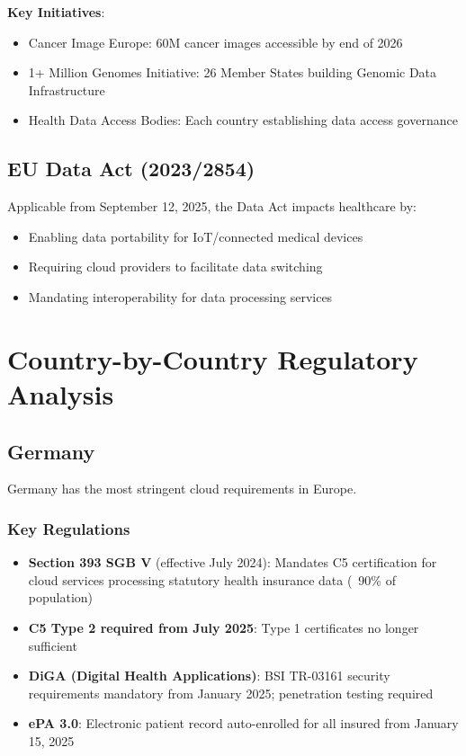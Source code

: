 \documentclass[11pt,a4paper]{article}
\begin{document}
\textbf{Key Initiatives}:
\begin{itemize}
    \item Cancer Image Europe: 60M cancer images accessible by end of 2026
    \item 1+ Million Genomes Initiative: 26 Member States building Genomic Data Infrastructure
    \item Health Data Access Bodies: Each country establishing data access governance
\end{itemize}

\subsection{EU Data Act (2023/2854)}

Applicable from September 12, 2025, the Data Act impacts healthcare by:
\begin{itemize}
    \item Enabling data portability for IoT/connected medical devices
    \item Requiring cloud providers to facilitate data switching
    \item Mandating interoperability for data processing services
\end{itemize}

\section{Country-by-Country Regulatory Analysis}

\subsection{Germany}

Germany has the most stringent cloud requirements in Europe.

\subsubsection{Key Regulations}

\begin{itemize}
    \item \textbf{Section 393 SGB V} (effective July 2024): Mandates C5 certification for cloud services processing statutory health insurance data (~90\% of population)
    \item \textbf{C5 Type 2 required from July 2025}: Type 1 certificates no longer sufficient
    \item \textbf{DiGA (Digital Health Applications)}: BSI TR-03161 security requirements mandatory from January 2025; penetration testing required
    \item \textbf{ePA 3.0}: Electronic patient record auto-enrolled for all insured from January 15, 2025
\end{itemize}
\end{document}
